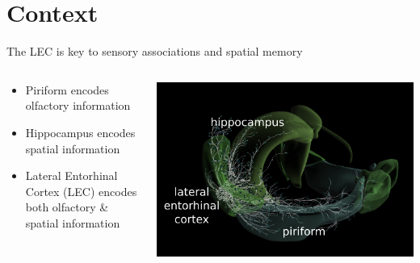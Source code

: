 \documentclass[bigger]{beamer}
\begin{document}
\section*{Context}
\label{sec:org69aa42e}
\begin{frame}[label={sec:org822dad7}]{The LEC is key to sensory associations and spatial memory}
\begin{columns}
\begin{column}{0.45\columnwidth}
\footnotesize
\begin{itemize}
\item \alert{Piriform} encodes olfactory information
\item \alert{Hippocampus} encodes spatial information
\item \alert{Lateral Entorhinal Cortex (LEC)} encodes both olfactory \& spatial information
\end{itemize}
\end{column}
\begin{column}{0.55\columnwidth}
\begin{center}
\includegraphics[width=\textwidth]{img/brain.png}
\end{center}
\end{column}
\end{columns}
\end{frame}
\end{document}
